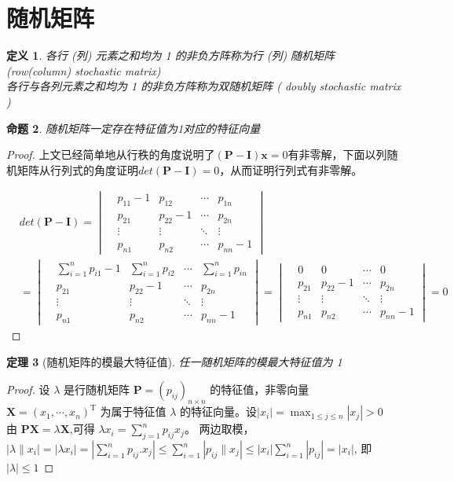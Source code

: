 \documentclass[12pt, a4paper, oneside]{ctexbook}
\newtheorem{theorem}{定理}[section]
\newtheorem{definition}[theorem]{定义}
\newtheorem{proposition}[theorem]{命题}
\begin{document}
\section{随机矩阵}
\begin{definition}
\noindent 各行 (列) 元素之和均为 1 的非负方阵称为行 (列) 随机矩阵 (row(column) stochastic matrix)\\
各行与各列元素之和均为 1 的非负方阵称为双随机矩阵 ( doubly stochastic matrix )
\end{definition}
\begin{proposition}
    随机矩阵一定存在特征值为1对应的特征向量  
\end{proposition}
\begin{proof}
    上文已经简单地从行秩的角度说明了$(\mathbf{P}-\mathbf{I})\mathbf{x} = 0$有非零解，下面以列随机矩阵从行列式的角度证明$det({\mathbf{P}-\mathbf{I}}
    ) = 0$，从而证明行列式有非零解。

    $$\begin{aligned}
        &det({\mathbf{P}-\mathbf{I}}) = 
        \begin{vmatrix}
            &p_{11}-1 & p_{12} &\cdots& p_{1n}\\
            &p_{21} &p_{22}-1&\cdots&p_{2n}\\
            &\vdots&\vdots&\ddots&\vdots\\
            &p_{n1}&p_{n2}&\cdots&p_{nn}-1
        \end{vmatrix}\\
        &=\begin{vmatrix}
            &\sum_{i=1}^np_{i1}-1 & \sum_{i=1}^np_{i2} &\cdots& \sum_{i=1}^np_{in}\\
            &p_{21} &p_{22}-1&\cdots&p_{2n}\\
            &\vdots&\vdots&\ddots&\vdots\\
            &p_{n1}&p_{n2}&\cdots&p_{nn}-1
        \end{vmatrix}
        =\begin{vmatrix}
            &0& 0 &\cdots& 0\\
            &p_{21} &p_{22}-1&\cdots&p_{2n}\\
            &\vdots&\vdots&\ddots&\vdots\\
            &p_{n1}&p_{n2}&\cdots&p_{nn}-1
        \end{vmatrix} = 0
    \end{aligned}$$
\end{proof}

\begin{theorem}[随机矩阵的模最大特征值]
    任一随机矩阵的模最大特征值为 1   
\end{theorem}
\begin{proof}
    设 $\lambda$ 是行随机矩阵 $\mathbf{P}=(p_{ij})_{n\times n}$ 的特征值，非零向量 $\mathbf{X} = ( x_1, \cdots , x_n) ^{\mathrm{T} }$ 为属于特征值 $\lambda$ 的特征向量。设$|x_i|=\max_{1\leq j\leq n}|x_j|>0$\\
    由 $\mathbf{PX}=\lambda\mathbf{X}$,可得 $\lambda x_i=\sum_{j=1}^np_{ij}x_j$。 两边取模，$|\lambda\|x_i|=|\lambda x_i|=\left|\sum_{i=1}^np_{ij}.x_j\right|\leq\sum_{i=1}^n|p_{ij}\|x_j|\leq|x_i|\sum_{i=1}^n|p_{ij}|=|x_i|$, 即$|\lambda|\leq1$
\end{proof}
\end{document}
